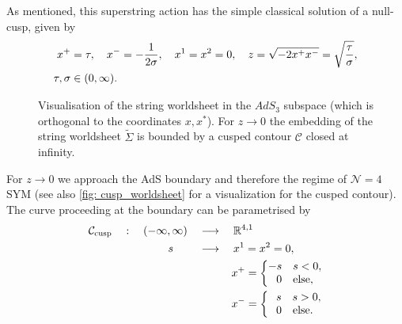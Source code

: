 %
%
As mentioned, this  superstring action has the simple classical solution of a null-cusp, given by
%
%
\begin{align}
x^{+}&=\tau, \quad x^{-}=-\frac{1}{2\sigma}, \quad x^{1}=x^{2}=0, \quad z=\sqrt{-2x^{+}x^{-}}=\sqrt{\frac{\tau}{\sigma}},\label{eq: null_cusp} \\
\tau,\sigma &\in (0,\infty). \notag
\end{align}
%
%
\begin{figure}
\begin{center}
\caption{Visualisation of the string worldsheet in the $AdS_{3}$ subspace (which is orthogonal to the coordinates $x,x^{*}$). For $z\to 0$ the embedding of the string worldsheet $\widetilde{\Sigma}$ is bounded by a cusped contour $\mathcal{C}$ closed at infinity.\label{fig: cusp_worldsheet}}
\end{center}
\end{figure}
%
%
For $z\to 0$ we approach the AdS boundary and therefore the regime of $\mathcal{N}=4$ SYM (see also \autoref{fig: cusp_worldsheet} for a visualization for the cusped contour). The curve proceeding at the boundary can be parametrised by
%
%
\begin{align}
\mathcal{C}_{\rm cusp}\quad :\quad (-\infty,\infty) \quad &\longrightarrow \quad \mathbb{R}^{4,1} \notag \\
%
s\qquad \; &\longrightarrow  \quad x^{1}=x^{2}=0, \\
&\qquad \quad x^{+}=\left\lbrace
\begin{matrix}
-s\quad s<0, \\
0\quad {\rm else,}
\end{matrix} \right. \notag \\
&\qquad \quad x^{-}=\left\lbrace
\begin{matrix}
\;\;\, s\quad s>0, \\
0\quad {\rm else.}
\end{matrix} \right. \notag
\end{align}
